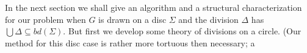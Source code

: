 
In the next section we shall give an algorithm and a structural characterization for our problem when $G$ is drawn on a disc $\Sigma$ and the division $\Delta$ has $\bigcup \Delta \subseteq bd(\Sigma)$. But first we develop some theory of divisions on a circle. (Our method for this disc case is rather more tortuous then necessary; a
